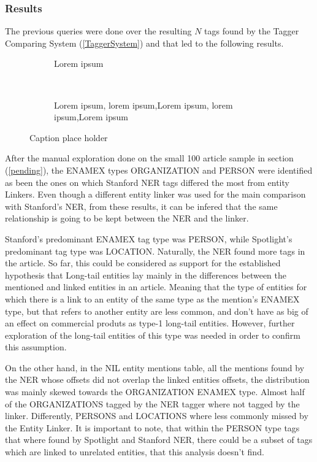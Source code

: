 \subsubsection{Results}
The previous queries were done over the resulting $N$ tags found by the Tagger Comparing System (\ref{TaggerSystem}) and that led to the following results.

\begin{figure*}[t!]
    \centering
    \begin{subfigure}[t]{0.5\textwidth}
        \centering
        \caption{Lorem ipsum}
    \end{subfigure}%
    ~ 
    \begin{subfigure}[t]{0.5\textwidth}
        \centering
            \caption{Lorem ipsum, lorem ipsum,Lorem ipsum, lorem ipsum,Lorem ipsum}
    \end{subfigure}
    \caption{Caption place holder}
\end{figure*}


After the manual exploration done on the small 100 article sample in section (\ref{pending}),
the ENAMEX types ORGANIZATION and PERSON were identified as been the ones on which Stanford NER tags differed the most from entity Linkers.
Even though a different entity linker was used for the main comparison with Stanford's NER, from these results,
it can be infered that the same relationship is going to be kept between the NER and the linker.

Stanford's predominant ENAMEX tag type was PERSON, while Spotlight's predominant tag type was LOCATION.
Naturally, the NER found more tags in the article.
So far, this could be considered as support for the established hypothesis that Long-tail entities lay mainly in the differences between 
the mentioned and linked entities in an article.
Meaning that the type of entities for which there is a link to an entity of the same type as the mention's ENAMEX type, but that refers to another entity
are less common, and don't have as big of an effect on commercial produts as type-1 long-tail entities.
However, further exploration of the long-tail entities of this type was needed in order to confirm this assumption.

On the other hand, in the NIL entity mentions table, all the mentions found by the NER whose offsets did not overlap the linked entities offsets,
the distribution was mainly skewed towards the ORGANIZATION ENAMEX type.
Almost half of the ORGANIZATIONS tagged by the NER tagger where not tagged by the linker.
Differently, PERSONS and LOCATIONS where less commonly missed by the Entity Linker.
It is important to note, that within the PERSON type tags that where found by Spotlight and Stanford NER, there could be a subset of tags which are linked to unrelated entities,
that this analysis doesn't find.

